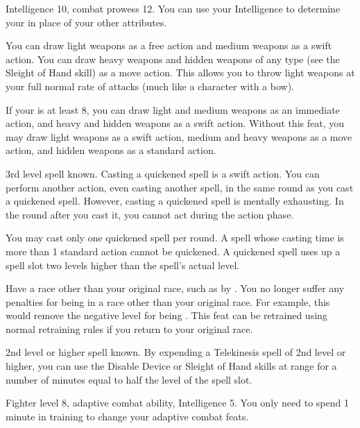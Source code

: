 \featpres Intelligence 10, combat prowess 12.
\featben You can use your Intelligence to determine your  in place of your other attributes.

\featben You can draw light weapons as a free action and medium weapons as a swift action.
You can draw heavy weapons and hidden weapons of any type (see the Sleight of Hand skill) as a move action.
This allows you to throw light weapons at your full normal rate of attacks (much like a character with a bow).

If your  is at least 8, you can draw light and medium weapons as an immediate action, and heavy and hidden weapons as a swift action.
Without this feat, you may draw light weapons as a swift action, medium and heavy weapons as a move action, and hidden weapons as a standard action.

\label{Quicken Spell}
\featpre 3rd level spell known.
\featben Casting a quickened spell is a swift action.
You can perform another action, even casting another spell, in the same round as you cast a quickened spell.
However, casting a quickened spell is mentally exhausting.
In the round after you cast it, you cannot act during the action phase.

You may cast only one quickened spell per round.
A spell whose casting time is more than 1 standard action cannot be quickened.
A quickened spell uses up a spell slot two levels higher than the spell's actual level.

\label{Racial Acclimation}
\featpres Have a race other than your original race, such as by .
\featben You no longer suffer any penalties for being in a race other than your original race.
For example, this would remove the negative level for being .
This feat can be retrained using normal retraining rules if you return to your original race.

\featpre 2nd level or higher  spell known.
\featben By expending a Telekinesis spell of 2nd level or higher, you can use the Disable Device or Sleight of Hand skills at \rngclose range for a number of minutes equal to half the level of the spell slot.

\featpres Fighter level 8, adaptive combat ability, Intelligence 5.
\featben You only need to spend 1 minute in training to change your adaptive combat feats.

